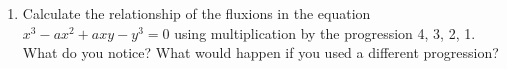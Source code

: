 \begin{exercises}{}{}
\begin{enumerate}
	\item%
	Calculate the relationship of the fluxions in the equation $x^3-ax^2+axy-y^3=0$ using multiplication by the progression 4, 3, 2, 1. What do you notice? What would happen if you used a different progression?
	

\end{enumerate}
\end{exercises}


